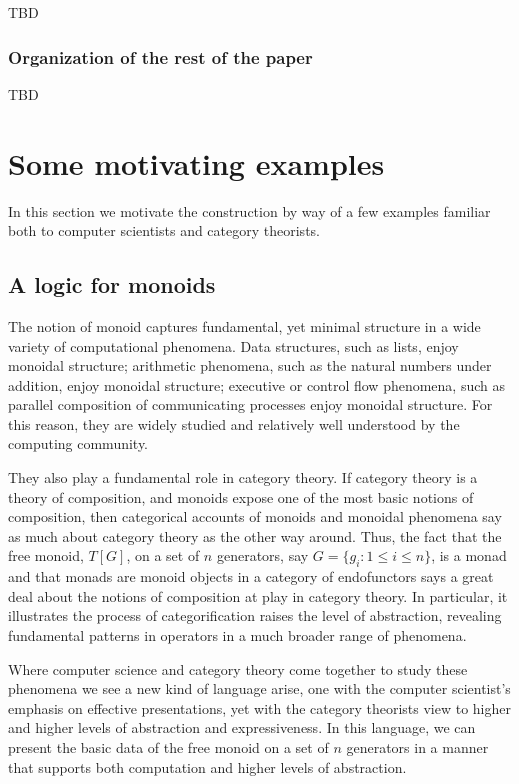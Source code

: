 \documentclass[]{acm_proc_article-sp}
\numberwithin{equation}{subsection}
\begin{document}
TBD

\subsubsection{Organization of the rest of the paper}

TBD


\section{Some motivating examples}

In this section we motivate the construction by way of a few examples
familiar both to computer scientists and category theorists.

\subsection{A logic for monoids}

The notion of monoid captures fundamental, yet minimal structure in a
wide variety of computational phenomena. Data structures, such as
lists, enjoy monoidal structure; arithmetic phenomena, such as the
natural numbers under addition, enjoy monoidal structure; executive or
control flow phenomena, such as parallel composition of communicating
processes enjoy monoidal structure. For this reason, they are widely
studied and relatively well understood by the computing community.

They also play a fundamental role in category theory. If category
theory is a theory of composition, and monoids expose one of the most
basic notions of composition, then categorical accounts of monoids and
monoidal phenomena say as much about category theory as the other way
around. Thus, the fact that the free monoid, $T[G]$, on a set of $n$
generators, say $G = \{ g_i : 1 \leq i \leq n \}$, is a monad and that
monads are monoid objects in a category of endofunctors says a great
deal about the notions of composition at play in category theory. In
particular, it illustrates the process of categorification raises the
level of abstraction, revealing fundamental patterns in operators in a
much broader range of phenomena.

Where computer science and category theory come together to study
these phenomena we see a new kind of language arise, one with the
computer scientist's emphasis on effective presentations, yet with the
category theorists view to higher and higher levels of abstraction and
expressiveness. In this language, we can present the basic data of the
free monoid on a set of $n$ generators in a manner that supports both
computation and higher levels of abstraction.
\end{document}
